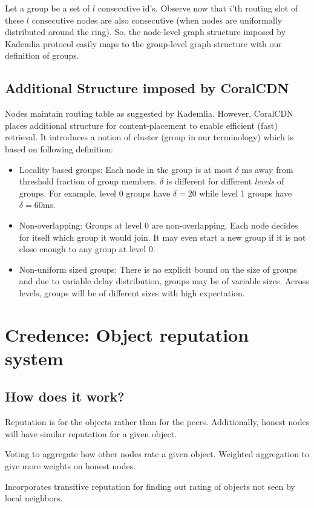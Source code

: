 Let a group be a set of $l$ consecutive id's. Observe now that $i$'th routing slot of these $l$ consecutive nodes are also consecutive (when nodes are uniformally distributed around the ring). So, the node-level graph structure imposed by Kademlia protocol easily maps to the group-level graph structure with our definition of groups.

\subsection{Additional Structure imposed by CoralCDN}
Nodes maintain routing table as suggested by Kademlia. However, CoralCDN places additional structure for content-placement to enable efficient (fast) retrieval. It introduces a notion of cluster (group in our terminology) which is based on following definition:
\begin{itemize}
\item{Locality based groups:} Each node in the group is at most $\delta$ ms away from threshold fraction of group members. $\delta$ is different for different \textit{levels} of groups. For example, level 0 groups have $\delta=20$ while level 1 groups have $\delta=60$ms. 
\item{Non-overlapping:} Groups at level 0 are non-overlapping. Each node decides for itself which group it would join. It may even start a new group if it is not close enough to any group at level 0.
\item{Non-uniform sized groups:} There is no explicit bound on the size of groups and due to variable delay distribution, groups may be of variable sizes. Across levels, groups will be of different sizes with high expectation.
\end{itemize}
\fi
\section{Credence: Object reputation system}

\subsection{How does it work?}
Reputation is for the objects rather than for the peers. Additionally, honest nodes will have similar reputation for a given object. 

Voting to aggregate how other nodes rate a given object. Weighted aggregation to give more weights on honest nodes.

Incorporates transitive reputation for finding out rating of objects not seen by local neighbors.

